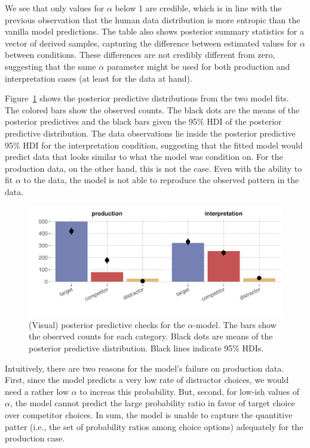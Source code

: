 \documentclass{article}
\begin{document}
We see that only values for \(\alpha\) below 1 are credible, which is in line with the previous observation that the human data distribution is more entropic than the vanilla model predictions.
The table also shows posterior summary statistics for a vector of derived samples, capturing the difference between estimated values for $\alpha$ between conditions.
These differences are not credibly different from zero, suggesting that the same \(\alpha\) parameter might be used for both production and interpretation cases (at least for the data at hand).

Figure~\ref{fig:PPC-alpha-model} shows the posterior predictive distributions from the two model fits.
The colored bars show the observed counts.
The black dots are the means of the posterior predictives and the black bars given the 95\% HDI of the posterior predictive distribution.
The data observations lie inside the posterior predictive 95\% HDI for the interpretation condition, suggesting that the fitted model would predict data that looks similar to what the model was condition on.
For the production data, on the other hand, this is not the case.
Even with the ability to fit \(\alpha\) to the data, the model is not able to reproduce the observed pattern in the data.

\begin{figure}[t]
  \centering

  \includegraphics[width = 0.9 \textwidth]{00-pics/PPC-alpha-model.pdf}

  \caption{(Visual) posterior predictive checks for the $\alpha$-model.
    The bars show the observed counts for each category.
    Black dots are means of the posterior predictive distribution.
    Black lines indicate 95\% HDIs.
  }
  \label{fig:PPC-alpha-model}
\end{figure}


Intuitively, there are two reasons for the model's failure on production data.
First, since the model predicts a very low rate of distractor choices, we would need a rather low \(\alpha\) to increas this probability.
But, second, for low-ish values of \(\alpha\), the model cannot predict the large probability ratio in favor of target choice over competitor choices.
In sum, the model is unable to capture the quantitive patter (i.e., the set of probability ratios among choice options) adequately for the production case.
\end{document}
